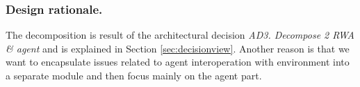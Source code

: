\documentclass{llncs}
\begin{document}
\subsubsection{Design rationale.} The decomposition is result of the architectural decision \emph{AD3. Decompose 2 RWA \& agent} and is explained in Section \ref{sec:decisionview}. Another reason is that we want to encapsulate issues related to agent interoperation with environment into a separate module and then focus mainly on the agent part.

\end{document}
